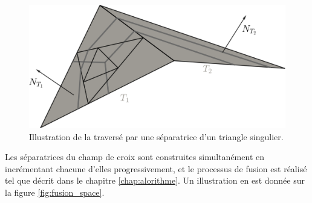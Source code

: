 \begin{figure}[!h]
  \centering
  \includegraphics[scale=0.32]{images/singulier_sepa_space.pdf}
  \caption{Illustration de la traversé par une séparatrice d'un triangle singulier.}
  \label{fig:singulier_sepa_space}
\end{figure}

Les séparatrices du champ de croix sont construites simultanément en incrémentant chacune d'elles progressivement, et le processus de fusion est réalisé tel que décrit dans le chapitre \ref{chap:alorithme}. Un illustration en est donnée sur la figure \ref{fig:fusion_space}.


